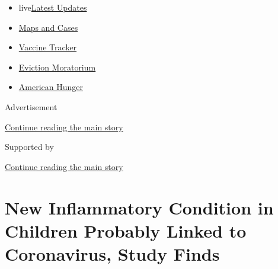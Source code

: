 \begin{itemize}
\tightlist
\item
  live\href{https://www.nytimes3xbfgragh.onion/2020/09/08/world/covid-19-coronavirus.html?name=styln-coronavirus-national\&region=TOP_BANNER\&block=storyline_menu_recirc\&action=click\&pgtype=Article\&impression_id=834d6671-f1d4-11ea-a677-9d581f459086\&variant=undefined}{Latest
  Updates}
\item
  \href{https://www.nytimes3xbfgragh.onion/interactive/2020/us/coronavirus-us-cases.html?name=styln-coronavirus-national\&region=TOP_BANNER\&block=storyline_menu_recirc\&action=click\&pgtype=Article\&impression_id=834d6672-f1d4-11ea-a677-9d581f459086\&variant=undefined}{Maps
  and Cases}
\item
  \href{https://www.nytimes3xbfgragh.onion/interactive/2020/science/coronavirus-vaccine-tracker.html?name=styln-coronavirus-national\&region=TOP_BANNER\&block=storyline_menu_recirc\&action=click\&pgtype=Article\&impression_id=834d8d80-f1d4-11ea-a677-9d581f459086\&variant=undefined}{Vaccine
  Tracker}
\item
  \href{https://www.nytimes3xbfgragh.onion/2020/09/02/your-money/eviction-moratorium-covid.html?name=styln-coronavirus-national\&region=TOP_BANNER\&block=storyline_menu_recirc\&action=click\&pgtype=Article\&impression_id=834d8d81-f1d4-11ea-a677-9d581f459086\&variant=undefined}{Eviction
  Moratorium}
\item
  \href{https://www.nytimes3xbfgragh.onion/interactive/2020/09/02/magazine/food-insecurity-hunger-us.html?name=styln-coronavirus-national\&region=TOP_BANNER\&block=storyline_menu_recirc\&action=click\&pgtype=Article\&impression_id=834d8d82-f1d4-11ea-a677-9d581f459086\&variant=undefined}{American
  Hunger}
\end{itemize}

Advertisement

\protect\hyperlink{after-top}{Continue reading the main story}

Supported by

\protect\hyperlink{after-sponsor}{Continue reading the main story}

\hypertarget{new-inflammatory-condition-in-children-probably-linked-to-coronavirus-study-finds}{%
\section{New Inflammatory Condition in Children Probably Linked to
Coronavirus, Study
Finds}\label{new-inflammatory-condition-in-children-probably-linked-to-coronavirus-study-finds}}

